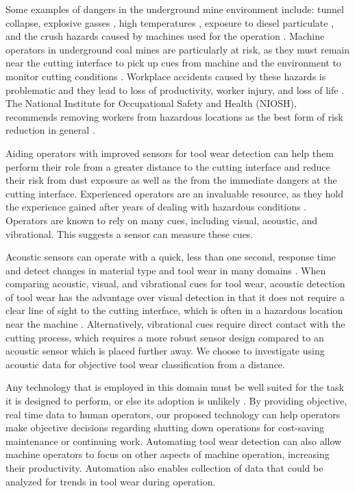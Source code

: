 Some examples of dangers in the underground mine environment include: 
tunnel collapse, explosive gasses \cite{Juganda2022},
high temperatures \cite{cinar2020}, exposure to diesel particulate \cite{Bugarski2022},
and the crush hazards caused by machines used for the operation \cite{Swanson2019}.
Machine operators in underground coal mines are particularly at risk,
as they must remain near the cutting interface to pick up cues from machine and the environment
to monitor cutting conditions \cite{Bartels2009}.
Workplace accidents caused by these hazards is problematic and they lead to 
loss of productivity, worker injury, and loss of life \cite{sensogut2021}.
The National Institute for Occupational Safety and Health (NIOSH), 
recommends removing workers from hazardous locations as the best form
of risk reduction in general \cite{niosh_2015}.

Aiding operators with improved sensors for tool wear detection can help them 
perform their role from a greater distance to the cutting interface and 
reduce their risk from dust exposure as well as the from the immediate dangers at the cutting interface.
Experienced operators are an invaluable resource, 
 as they hold the experience gained after years of dealing with hazardous conditions \cite{Bartels2009}.
Operators are known to rely on many cues, including visual, acoustic, and vibrational.
This suggests a sensor can measure these cues.

Acoustic sensors can operate with a quick, less than one second, response time and detect changes in 
material type and tool wear in many domains \cite{Zakeri2017, Zhong2013, Rad2014, Zakeri2015}.
When comparing acoustic, visual, and vibrational cues for tool wear,
acoustic detection of tool wear has the advantage over visual detection in that it
does not require a clear line of sight to the cutting interface, 
which is often in a hazardous location near the machine \cite{Bartels2009}.
Alternatively, vibrational cues require direct contact with the cutting process, 
which requires a more robust sensor design compared to an acoustic sensor which is placed further away.
We choose to investigate using acoustic data for objective tool wear classification from a distance.

Any technology that is employed in this domain must be well suited for the task it is
designed to perform, or else its adoption is unlikely \cite{Swanson2019}.
By providing objective, real time data to human operators, 
our proposed technology can help operators make objective decisions 
regarding shutting down operations for cost-saving maintenance or continuing work.
Automating tool wear detection can also allow machine operators to focus on other aspects of machine operation, 
increasing their productivity.
Automation also enables collection of data that could be analyzed for trends in tool wear during operation.

